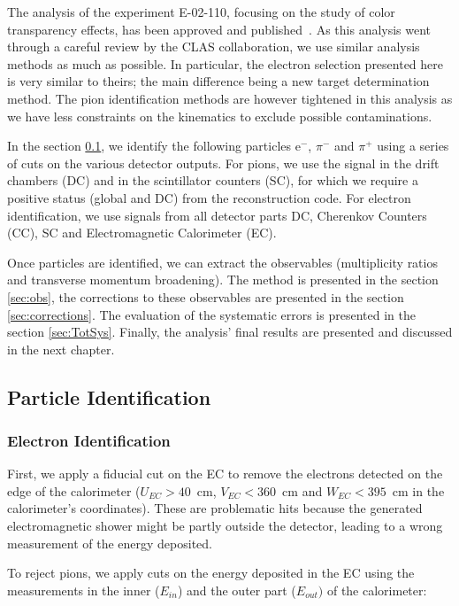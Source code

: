 The analysis of the experiment E-02-110, focusing on the study of color 
transparency effects, has been approved and published~\cite{ElFassi:2008}. As this 
analysis went through a careful review by the CLAS collaboration, we use
similar analysis methods as much as possible. In particular, the electron selection 
presented here is very similar to theirs; the main difference being a new 
target determination method. The pion identification methods are however tightened
in this analysis as we have less constraints on the kinematics to exclude possible
contaminations.

In the section \ref{sec:pid}, we identify the following particles e$^-$, 
$\pi^-$ and $\pi^+$ using a series of cuts on the various 
detector outputs. For pions, we use the signal in the drift chambers (DC) and 
in the scintillator counters (SC), for which we require a positive status (global and DC) 
from the reconstruction code. For electron identification, we use signals from 
all detector parts DC, Cherenkov Counters (CC), SC and Electromagnetic 
Calorimeter (EC).

Once particles are identified, we can extract the observables (multiplicity 
ratios and transverse momentum broadening). The method is presented in the 
section \ref{sec:obs}, the corrections to these observables are presented in the 
section \ref{sec:corrections}. The evaluation of 
the systematic errors is presented in the section \ref{sec:TotSys}.
Finally, the analysis' final results are presented and discussed in the next chapter.

\subsection{Particle Identification}
\label{sec:pid}

\subsubsection{Electron Identification}

First, we apply a fiducial cut on the EC to remove the electrons detected on 
the edge of the calorimeter ($U_{EC}>40$~cm, $V_{EC}<360$~cm and 
$W_{EC}<395$~cm in the calorimeter's coordinates). These are problematic hits 
because the generated electromagnetic shower might be partly outside the 
detector, leading to a wrong measurement of the energy deposited.

To reject pions, we apply cuts on the energy deposited
in the EC using the measurements in the inner ($E_{in}$) and the 
outer part ($E_{out})$ of the calorimeter:

